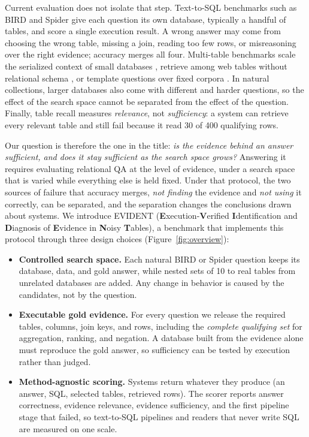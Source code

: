 \documentclass[11pt]{article}
\newcommand{\benchmark}{\mbox{EVIDENT}}  %
\begin{document}
Current evaluation does not isolate that step. Text-to-SQL benchmarks such as BIRD and Spider \citep{bird,spider} give each question its own database, typically a handful of tables, and score a single execution result. A wrong answer may come from choosing the wrong table, missing a join, reading too few rows, or misreasoning over the right evidence; accuracy merges all four. Multi-table benchmarks scale the serialized context of small databases \citep{tqabench}, retrieve among web tables without relational schema \citep{trag}, or template questions over fixed corpora \citep{mmqa}. In natural collections, larger databases also come with different and harder questions, so the effect of the search space cannot be separated from the effect of the question. Finally, table recall measures \emph{relevance}, not \emph{sufficiency}: a system can retrieve every relevant table and still fail because it read 30 of 400 qualifying rows.

Our question is therefore the one in the title: \emph{is the evidence behind an answer sufficient, and does it stay sufficient as the search space grows?} Answering it requires evaluating relational QA at the level of evidence, under a search space that is varied while everything else is held fixed. Under that protocol, the two sources of failure that accuracy merges, \emph{not finding} the evidence and \emph{not using} it correctly, can be separated, and the separation changes the conclusions drawn about systems. We introduce \benchmark{} (\textbf{E}xecution-\textbf{V}erified \textbf{I}dentification and \textbf{D}iagnosis of \textbf{E}vidence in \textbf{N}oisy \textbf{T}ables), a benchmark that implements this protocol through three design choices (Figure~\ref{fig:overview}):
\begin{itemize}
\item \textbf{Controlled search space.} Each natural BIRD or Spider question keeps its database, data, and gold answer, while nested sets of 10 to \topLevel{} real tables from unrelated databases are added. Any change in behavior is caused by the candidates, not by the question.
\item \textbf{Executable gold evidence.} For every question we release the required tables, columns, join keys, and rows, including the \emph{complete qualifying set} for aggregation, ranking, and negation. A database built from the evidence alone must reproduce the gold answer, so sufficiency can be tested by execution rather than judged.
\item \textbf{Method-agnostic scoring.} Systems return whatever they produce (an answer, SQL, selected tables, retrieved rows). The scorer reports answer correctness, evidence relevance, evidence sufficiency, and the first pipeline stage that failed, so text-to-SQL pipelines and readers that never write SQL are measured on one scale.
\end{itemize}
\end{document}
